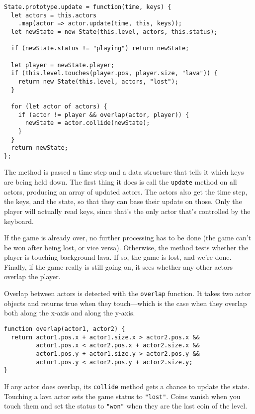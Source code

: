 \begin{lstlisting}
State.prototype.update = function(time, keys) {
  let actors = this.actors
    .map(actor => actor.update(time, this, keys));
  let newState = new State(this.level, actors, this.status);

  if (newState.status != "playing") return newState;

  let player = newState.player;
  if (this.level.touches(player.pos, player.size, "lava")) {
    return new State(this.level, actors, "lost");
  }

  for (let actor of actors) {
    if (actor != player && overlap(actor, player)) {
      newState = actor.collide(newState);
    }
  }
  return newState;
};
\end{lstlisting}
\noindent

The method is passed a time step and a data structure that tells it which keys are being held down. The first thing it does is call the \lstinline`update` method on all actors, producing an array of updated actors. The actors also get the time step, the keys, and the state, so that they can base their update on those. Only the player will actually read keys, since that's the only actor that's controlled by the keyboard.

If the game is already over, no further processing has to be done (the game can't be won after being lost, or vice versa). Otherwise, the method tests whether the player is touching background lava. If so, the game is lost, and we're done. Finally, if the game really is still going on, it sees whether any other actors overlap the player.

Overlap between actors is detected with the \lstinline`overlap` function. It takes two actor objects and returns true when they touch—which is the case when they overlap both along the x-axis and along the y-axis.

\begin{lstlisting}
function overlap(actor1, actor2) {
  return actor1.pos.x + actor1.size.x > actor2.pos.x &&
         actor1.pos.x < actor2.pos.x + actor2.size.x &&
         actor1.pos.y + actor1.size.y > actor2.pos.y &&
         actor1.pos.y < actor2.pos.y + actor2.size.y;
}
\end{lstlisting}
\noindent

If any actor does overlap, its \lstinline`collide` method gets a chance to update the state. Touching a lava actor sets the game status to \lstinline`"lost"`. Coins vanish when you touch them and set the status to \lstinline`"won"` when they are the last coin of the level.

